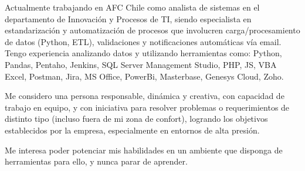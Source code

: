 

\begin{cvparagraph}

Actualmente trabajando en AFC Chile como analista de sistemas en el departamento de Innovación y Procesos de TI, siendo especialista en estandarización y automatización de procesos que involucren carga/procesamiento de datos (Python, ETL), validaciones y notificaciones automáticas vía email. Tengo experiencia analizando datos y utilizando herramientas como: Python, Pandas, Pentaho, Jenkins, SQL Server Management Studio, PHP, JS, VBA Excel, Postman, Jira, MS Office, PowerBi, Masterbase, Genesys Cloud, Zoho.

Me considero una persona responsable, dinámica y creativa, con capacidad de trabajo en equipo, y con iniciativa para resolver problemas o requerimientos de distinto tipo (incluso fuera de mi zona de confort), logrando los objetivos establecidos por la empresa, especialmente en entornos de alta presión.

Me interesa poder potenciar mis habilidades en un ambiente que disponga de herramientas para ello, y nunca parar de aprender.

\end{cvparagraph}
